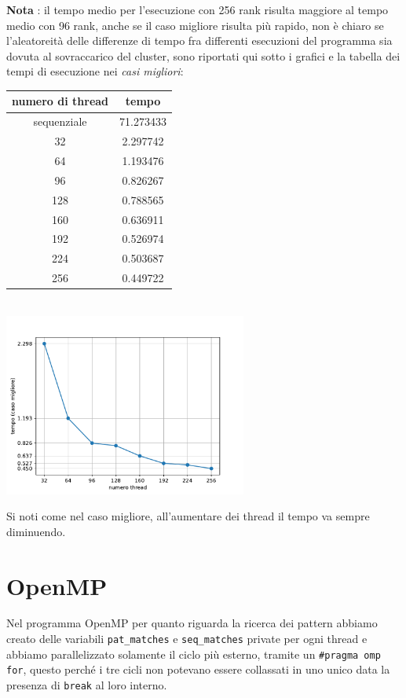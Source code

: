 \documentclass[12pt,openany]{report}
\begin{document}
\textbf{Nota} : il tempo medio per l'esecuzione con 256 rank risulta maggiore al tempo medio con 96 rank, anche se il caso migliore risulta più rapido, non è chiaro se l'aleatoreità delle differenze di tempo fra differenti esecuzioni del programma sia dovuta al sovraccarico del cluster,  sono riportati qui sotto i grafici e la tabella dei tempi di esecuzione nei \textit{casi migliori}:\begin{center}
    \begin{tabular}{|c|c|}
        \hline
        \rowcolor[HTML]{EFEFEF} 
        numero di thread & tempo     \\ \hline
        sequenziale      & 71.273433 \\ \hline
        32               & 2.297742  \\ \hline
        64               & 1.193476  \\ \hline
        96               & 0.826267  \\ \hline
        128              & 0.788565  \\ \hline
        160              & 0.636911  \\ \hline
        192              & 0.526974  \\ \hline
        224              & 0.503687  \\ \hline
        256              & 0.449722  \\ \hline
        \end{tabular}\\ 
        \includegraphics[width=0.6\textwidth ]{images/tempi_MPI_bestcase.pdf}
\end{center}
Si noti come nel caso migliore, all'aumentare dei thread il tempo va sempre diminuendo.



\newpage
\section{OpenMP}
Nel programma OpenMP per quanto riguarda la ricerca dei pattern abbiamo creato delle variabili \texttt{pat\_matches} e \texttt{seq\_matches} private per ogni thread e abbiamo parallelizzato solamente il ciclo più esterno, tramite un \texttt{\#pragma omp for}, questo perché i tre cicli non potevano essere collassati in uno unico data la presenza di \texttt{break} al loro interno.
\bigskip
\end{document}
